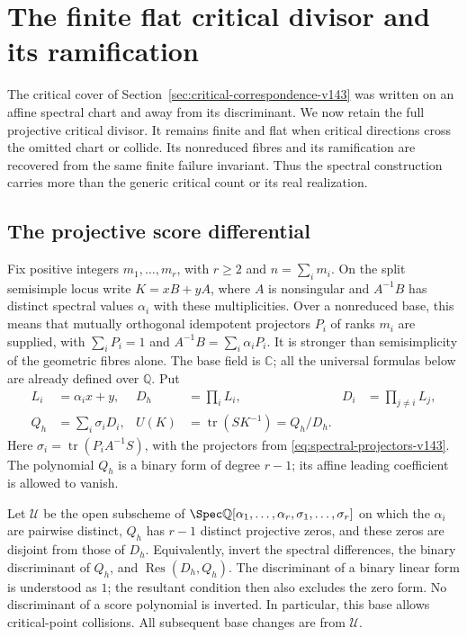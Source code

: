 \section{The finite flat critical divisor and its ramification}
\label{sec:projective-critical-v144}

The critical cover of Section~\ref{sec:critical-correspondence-v143}
was written on an affine spectral chart and away from its discriminant.
We now retain the full projective critical divisor.  It remains finite
and flat when critical directions cross the omitted chart or collide.
Its nonreduced fibres and its ramification are recovered from the same
finite failure invariant.  Thus the spectral construction carries more
than the generic critical count or its real realization.

\subsection{The projective score differential}
Fix positive integers \(m_1,\ldots,m_r\), with \(r\ge2\) and
\(n=\sum_i m_i\).  On the split semisimple locus write
\(K=xB+yA\), where \(A\) is nonsingular and \(A^{-1}B\) has
distinct spectral values \(\alpha_i\) with these multiplicities.
Over a nonreduced base, this means that mutually orthogonal idempotent
projectors \(P_i\) of ranks \(m_i\) are supplied, with
\(\sum_iP_i=1\) and \(A^{-1}B=\sum_i\alpha_iP_i\).
It is stronger than semisimplicity of the geometric fibres alone.
The base field is \(\mathbb C\); all the universal formulas below
are already defined over \(\mathbb Q\).  Put
\begin{equation}\label{eq:binary-spectral-data-v144}
 \begin{split}
 L_i&=\alpha_i x+y,&
 D_h&=\prod_i L_i,& D_i&=\prod_{j\ne i}L_j,\\
 Q_h&=\sum_i\sigma_iD_i,&
 U(K)&=\operatorname{tr}(SK^{-1})=Q_h/D_h.
 \end{split}
\end{equation}
Here \(\sigma_i=\operatorname{tr}(P_iA^{-1}S)\), with the
projectors from \eqref{eq:spectral-projectors-v143}.  The polynomial
\(Q_h\) is a binary form of degree \(r-1\); its affine leading
coefficient is allowed to vanish.

Let \(\mathscr U\) be the open subscheme of
\(\Spec\mathbb Q[\alpha_1,\ldots,\alpha_r,\sigma_1,\ldots,\sigma_r]\)
on which the \(\alpha_i\) are pairwise distinct, \(Q_h\) has
\(r-1\) distinct projective zeros, and these zeros are disjoint from
those of \(D_h\).  Equivalently, invert the spectral differences,
the binary discriminant of \(Q_h\), and
\(\operatorname{Res}(D_h,Q_h)\).  The discriminant of a binary
linear form is understood as \(1\); the resultant condition then
also excludes the zero form.  No discriminant of a score polynomial
is inverted.  In particular, this base allows critical-point
collisions.  All subsequent base changes are from \(\mathscr U\).

